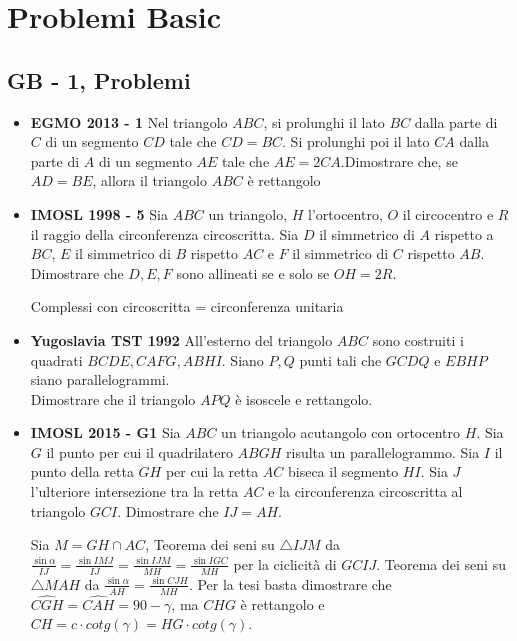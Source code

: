 \section{Problemi Basic}
\subsection{GB - 1, Problemi}
\begin{itemize}
 \item \textbf{EGMO 2013 - 1} Nel triangolo $ABC$, si prolunghi il lato $BC$ dalla parte di $C$ di un segmento $CD$ tale che $CD=BC$. Si prolunghi poi il lato $CA$ dalla parte di $A$ di un segmento $AE$ tale che $AE= 2CA$.Dimostrare che, se $AD=BE$, allora il triangolo $ABC$ è rettangolo
 
 \item \textbf{IMOSL 1998 - 5} Sia $ABC$ un triangolo, $H$ l'ortocentro, $O$ il circocentro e $R$ il raggio della circonferenza circoscritta. Sia $D$ il simmetrico di $A$ rispetto a $BC$, $E$ il simmetrico di $B$ rispetto $AC$ e $F$ il simmetrico di $C$ rispetto $AB$.\\
 Dimostrare che $D,E,F$ sono allineati se e solo se $OH=2R$.

 \begin{sol}
 Complessi con circoscritta = circonferenza unitaria
\end{sol}

\item \textbf{Yugoslavia TST 1992} All'esterno del triangolo $ABC$ sono costruiti i quadrati $BCDE,CAFG,ABHI$. Siano $P,Q$ punti tali che $GCDQ$ e $EBHP$ siano parallelogrammi.\\
Dimostrare che il triangolo $APQ$ è isoscele e rettangolo.

 
 
 \item \textbf{IMOSL 2015 - G1} Sia $ABC$ un triangolo acutangolo con ortocentro $H$. Sia $G$ il punto per cui il quadrilatero $ABGH$ risulta un parallelogrammo. Sia $I$ il punto della retta $GH$ per cui
la retta $AC$ biseca il segmento $HI$. Sia $J$ l’ulteriore intersezione tra la retta $AC$ e la
circonferenza circoscritta al triangolo $GCI$.
Dimostrare che $IJ = AH$.

\begin{sol}
 Sia $M=GH\cap AC$, Teorema dei seni su $\triangle IJM$ da $\frac{\sin\alpha}{IJ}=\frac{\sin IMJ}{IJ}=\frac{\sin IJM}{MH}=\frac{\sin IGC}{MH}$ per la ciclicità di $GCIJ$. Teorema dei seni su $\triangle MAH$ da $\frac{\sin\alpha}{AH}=\frac{\sin CJH}{MH}$. Per la tesi basta dimostrare che $\widehat{CGH}=\widehat{CAH}=90-\gamma$, ma $CHG$ è rettangolo e $CH=c\cdot cotg(\gamma)=HG\cdot cotg(\gamma)$.
\end{sol}


\end{itemize}
